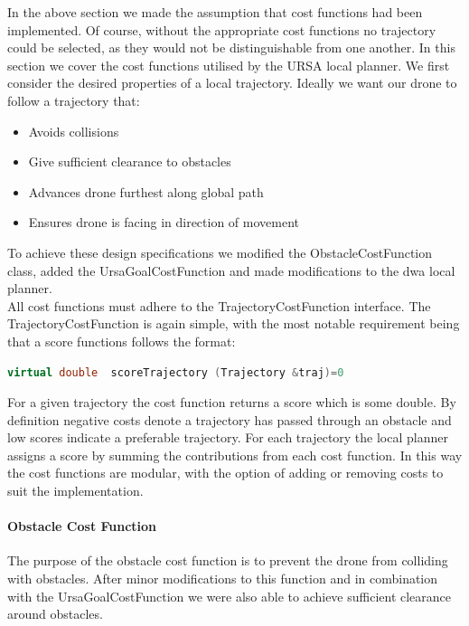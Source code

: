 \documentclass[capstone_report.tex]{subfiles}
\begin{document}
In the above section we made the assumption that cost functions had been implemented.  Of course, without the appropriate cost functions no trajectory could be selected, as they would not be distinguishable from one another.  In this section we cover the cost functions utilised by the URSA local planner.  We first consider the desired properties of a local trajectory.  Ideally we want our drone to follow a trajectory that:
\begin{itemize}
    \item Avoids collisions
    \item Give sufficient clearance to obstacles
    \item Advances drone furthest along global path
    \item Ensures drone is facing in direction of movement
\end{itemize}

To achieve these design specifications we modified the ObstacleCostFunction class, added the UrsaGoalCostFunction and made modifications to the dwa local planner.\\

All cost functions must adhere to the TrajectoryCostFunction interface. The TrajectoryCostFunction is again simple, with the most notable requirement being that a score functions follows the format:

\begin{lstlisting}[language=c++]
    virtual double  scoreTrajectory (Trajectory &traj)=0
\end{lstlisting}

For a given trajectory the cost function returns a score which is some double.  By definition negative costs denote a trajectory has passed through an obstacle and low scores indicate a preferable trajectory.  For each trajectory the local planner assigns a score by summing the contributions from each cost function.   In this way the cost functions are modular, with the option of adding or removing costs to suit the implementation.  

\paragraph{Obstacle Cost Function}  
The purpose of the obstacle cost function is to prevent the drone from colliding with obstacles.  After minor modifications to this function and in combination with the UrsaGoalCostFunction we were also able to achieve sufficient clearance around obstacles. \\
\end{document}
